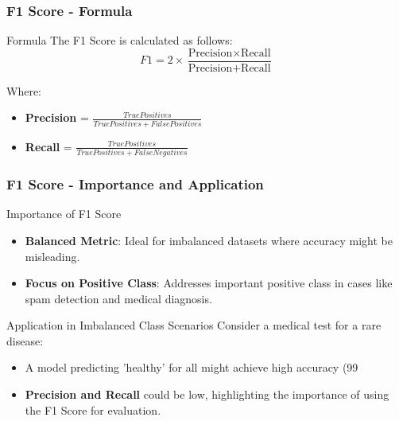 \documentclass[aspectratio=169]{beamer}
\begin{document}
\begin{frame}[fragile]
    \frametitle{F1 Score - Formula}
    \begin{block}{Formula}
        The F1 Score is calculated as follows:
        \begin{equation}
            F1 = 2 \times \frac{\text{Precision} \times \text{Recall}}{\text{Precision} + \text{Recall}}
        \end{equation}
    \end{block}
    Where:
    \begin{itemize}
        \item \textbf{Precision} = \(\frac{True Positives}{True Positives + False Positives}\)
        \item \textbf{Recall} = \(\frac{True Positives}{True Positives + False Negatives}\)
    \end{itemize}
\end{frame}

\begin{frame}[fragile]
    \frametitle{F1 Score - Importance and Application}
    \begin{block}{Importance of F1 Score}
        \begin{itemize}
            \item \textbf{Balanced Metric}: Ideal for imbalanced datasets where accuracy might be misleading.
            \item \textbf{Focus on Positive Class}: Addresses important positive class in cases like spam detection and medical diagnosis.
        \end{itemize}
    \end{block}

    \begin{block}{Application in Imbalanced Class Scenarios}
        Consider a medical test for a rare disease:
        \begin{itemize}
            \item A model predicting 'healthy' for all might achieve high accuracy (99%
            \item \textbf{Precision and Recall} could be low, highlighting the importance of using the F1 Score for evaluation.
        \end{itemize}
    \end{block}
\end{frame}
\end{document}
